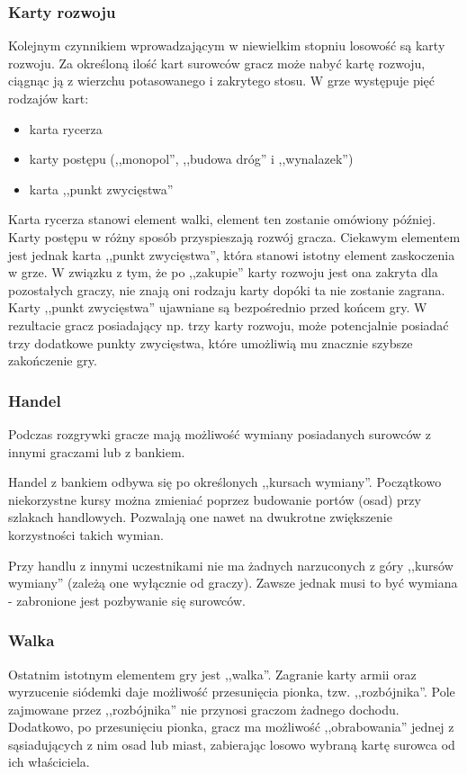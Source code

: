\documentclass[a4paper,12pt]{article}
\begin{document}
\subsubsection{Karty rozwoju}
Kolejnym czynnikiem wprowadzającym w niewielkim stopniu losowość są
karty rozwoju. Za określoną ilość kart surowców gracz może nabyć kartę
rozwoju, ciągnąc ją z wierzchu potasowanego i zakrytego stosu. W grze
występuje pięć rodzajów kart:

\begin{itemize}
\item karta rycerza
\item karty postępu (,,monopol'', ,,budowa dróg'' i ,,wynalazek'')
\item karta ,,punkt zwycięstwa''
\end{itemize}

Karta rycerza stanowi element walki, element ten zostanie omówiony
później. Karty postępu w różny sposób przyspieszają rozwój
gracza. Ciekawym elementem jest jednak karta ,,punkt zwycięstwa'',
która stanowi istotny element zaskoczenia w grze. W związku z tym, że
po ,,zakupie'' karty rozwoju jest ona zakryta dla pozostałych graczy,
nie znają oni rodzaju karty dopóki ta nie zostanie zagrana. Karty
,,punkt zwycięstwa'' ujawniane są bezpośrednio przed końcem gry. W
rezultacie gracz posiadający np. trzy karty rozwoju, może potencjalnie
posiadać trzy dodatkowe punkty zwycięstwa, które umożliwią mu znacznie
szybsze zakończenie gry.

\subsubsection{Handel}
Podczas rozgrywki gracze mają możliwość wymiany posiadanych surowców z
innymi graczami lub z bankiem.

Handel z bankiem odbywa się po określonych ,,kursach
wymiany''. Początkowo niekorzystne kursy można zmieniać poprzez
budowanie portów (osad) przy szlakach handlowych. Pozwalają one nawet
na dwukrotne zwiększenie korzystności takich wymian.

Przy handlu z innymi uczestnikami nie ma żadnych narzuconych z góry
,,kursów wymiany'' (zależą one wyłącznie od graczy). Zawsze jednak
musi to być wymiana - zabronione jest pozbywanie się surowców.

\subsubsection{Walka}
Ostatnim istotnym elementem gry jest ,,walka''. Zagranie karty armii
oraz wyrzucenie siódemki daje możliwość przesunięcia pionka,
tzw. ,,rozbójnika''. Pole zajmowane przez ,,rozbójnika'' nie przynosi
graczom żadnego dochodu. Dodatkowo, po przesunięciu pionka, gracz ma
możliwość ,,obrabowania'' jednej z sąsiadujących z nim osad lub miast,
zabierając losowo wybraną kartę surowca od ich właściciela.
\end{document}

